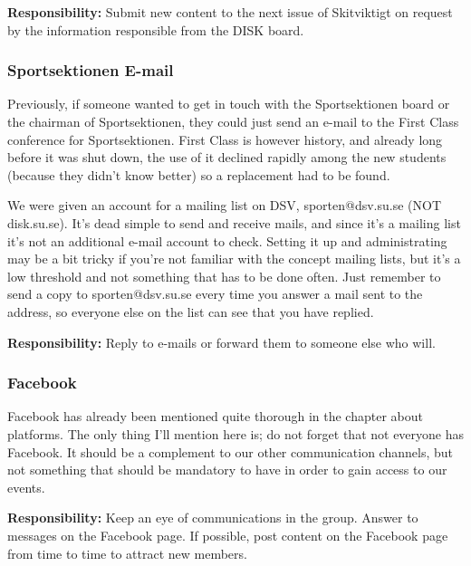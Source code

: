 \documentclass[12pt,a4paper]{article}
\begin{document}
			\textbf{Responsibility:} Submit new content to the next issue of Skitviktigt on request by the information responsible from the DISK board.
			\subsubsection{Sportsektionen E-mail}
			Previously, if someone wanted to get in touch with the Sportsektionen board or the chairman of Sportsektionen, they could just send an e-mail to the First Class conference for Sportsektionen. First Class is however history, and already long before it was shut down, the use of it declined rapidly among the new students (because they didn't know better) so a replacement had to be found.

			We were given an account for a mailing list on DSV, sporten@dsv.su.se (NOT disk.su.se). It's dead simple to send and receive mails, and since it's a mailing list it's not an additional e-mail account to check. Setting it up and administrating may be a bit tricky if you're not familiar with the concept mailing lists, but it's a low threshold and not something that has to be done often. Just remember to send a copy to sporten@dsv.su.se every time you answer a mail sent to the address, so everyone else on the list can see that you have replied.

			\textbf{Responsibility:} Reply to e-mails or forward them to someone else who will.
			\subsubsection{Facebook}
			Facebook has already been mentioned quite thorough in the chapter about platforms. The only thing I'll mention here is; do not forget that not everyone has Facebook. It should be a complement to our other communication channels, but not something that should be mandatory to have in order to gain access to our events.

			\textbf{Responsibility:} Keep an eye of communications in the group. Answer to messages on the Facebook page. If possible, post content on the Facebook page from time to time to attract new members.
\end{document}
